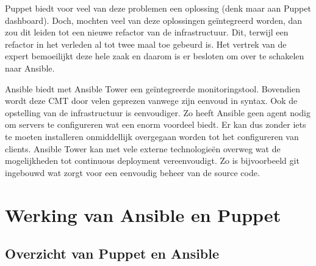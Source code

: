 Puppet biedt voor veel van deze problemen een oplossing (denk maar aan Puppet dashboard). Doch, mochten veel van deze oplossingen ge\"integreerd worden, dan zou dit leiden tot een  nieuwe refactor van de infrastructuur. Dit, terwijl een refactor in het verleden al tot twee maal toe gebeurd is. Het vertrek van de expert bemoeilijkt deze hele zaak en daarom is er besloten om over te schakelen naar Ansible. 

Ansible biedt met Ansible Tower een ge\"integreerde monitoringstool. Bovendien wordt deze \gls{CMT} door velen geprezen vanwege zijn eenvoud in syntax. Ook de opstelling van de infrastructuur is eenvoudiger. Zo heeft Ansible geen agent nodig om servers te configureren wat een enorm voordeel biedt. Er kan dus zonder iets te moeten installeren onmiddellijk overgegaan worden tot het configureren van clients. Ansible Tower kan met vele externe technologie\"en overweg wat de mogelijkheden tot continuous deployment vereenvoudigt. Zo is bijvoorbeeld git ingebouwd wat zorgt voor een eenvoudig beheer van de source code.


\section{Werking van Ansible en Puppet}
\label{sec:methodologie-technische-verschillen}

\subsection{Overzicht van Puppet en Ansible}



